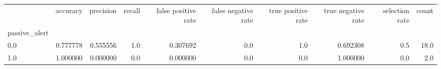 \begin{tabular}{lrrrrrrrrr}
\toprule
{} &  accuracy &  precision &  recall &  false positive rate &  false negative rate &  true positive rate &  true negative rate &  selection rate &  count \\
passive\_alert &           &            &         &                      &                      &                     &                     &                 &        \\
\midrule
0.0           &  0.777778 &   0.555556 &     1.0 &             0.307692 &                  0.0 &                 1.0 &            0.692308 &             0.5 &   18.0 \\
1.0           &  1.000000 &   0.000000 &     0.0 &             0.000000 &                  0.0 &                 0.0 &            1.000000 &             0.0 &    2.0 \\
\bottomrule
\end{tabular}
